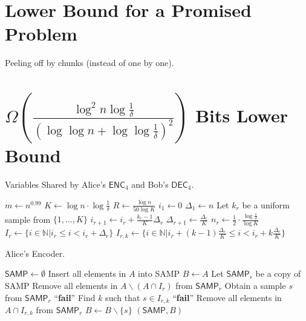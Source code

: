 \documentclass[10pt]{article}
\newcommand{\samp}{\textsf{SAMP}\xspace}
\newcommand{\enc}{\textsf{ENC}\xspace}
\newcommand{\dec}{\textsf{DEC}\xspace}
\begin{document}
\section{Lower Bound for a Promised Problem}
Peeling off by chunks (instead of one by one). 

\section{$\Omega(\frac{\log^2 n\log{\frac{1}{\delta}}}{(\log\log n+\log\log \frac{1}{\delta})^2})$ Bits Lower Bound}



\begin{algorithm}[H]
  \caption{Variables Shared by Alice's $\enc_4$ and Bob's $\dec_4$.}
  \begin{algorithmic}[1]
    \State $m\leftarrow n^{0.99}$
    \State $K\leftarrow \log n \cdot \log \frac{1}{\delta}$
    \State $R\leftarrow \frac{\log n}{50 \log K}$
    \State $i_1\leftarrow 0$
    \State $\Delta_1\leftarrow n$
      \State Let $k_r$ be a uniform sample from $\{1, \ldots, K\}$
      \State $i_{r+1}\leftarrow i_r+\frac{k_r-1}{K}\Delta_r$
      \State $\Delta_{r+1}\leftarrow \frac{\Delta_r}{K}$
    \EndFor
      \State $n_r\leftarrow \frac{1}{2} \cdot \frac{\log \frac{1}{\delta}}{\log K}$
      \State $I_r \leftarrow \{i\in \mathbb{N}|i_r\le i < i_r+\Delta_r\}$
        \State $I_{r,k}\leftarrow \{i\in \mathbb{N}|i_r+(k-1)\frac{\Delta_r}{K}\le i < i_r+k\frac{\Delta_r}{K}\}$
      \EndFor
    \EndFor
  \end{algorithmic}
\end{algorithm}

\begin{algorithm}[H]
  \caption{Alice's Encoder.}
  \begin{algorithmic}[1]
    \Procedure{$\enc_4$}{$A$}
    \State $\samp \leftarrow \emptyset$
    \State Insert all elements in $A$ into \samp
    \State $B\leftarrow A$
      \State Let $\samp_r$ be a copy of \samp
      \State Remove all elements in $A\backslash (A\cap I_r)$ from $\samp_r$
        \State Obtain a sample $s$ from $\samp_r$ 
          \State \Return ``\textbf{fail}'' \label{algo-enc_4:sampler-wrong}
        \EndIf
        \State Find $k$ such that $s\in I_{r,k}$ 
          \State \Return ``\textbf{fail}'' \label{algo-enc_4:kill-wrong}
        \EndIf
        \State Remove all elements in $A\cap I_{r,k}$ from $\samp_r$
        \State $B \leftarrow B \backslash \{s\}$
      \EndFor
    \EndFor
    \State \Return $(\samp, B)$ 
    \EndProcedure
  \end{algorithmic}
\end{algorithm}
\end{document}
